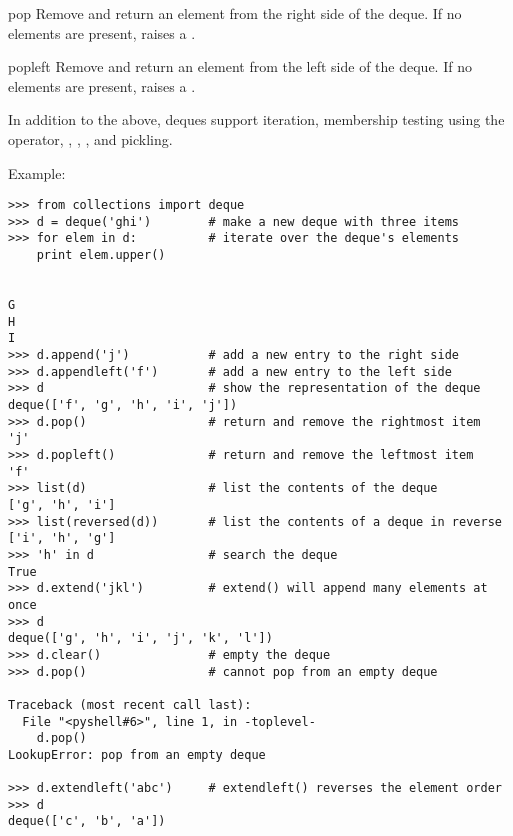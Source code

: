 \begin{methoddesc}{pop}{}
   Remove and return an element from the right side of the deque.
   If no elements are present, raises a .
\end{methoddesc}

\begin{methoddesc}{popleft}{}
   Remove and return an element from the left side of the deque.
   If no elements are present, raises a .   
\end{methoddesc}

In addition to the above, deques support iteration, membership testing
using the  operator, , ,
,  and pickling.

Example:

\begin{verbatim}
>>> from collections import deque
>>> d = deque('ghi')        # make a new deque with three items
>>> for elem in d:          # iterate over the deque's elements
	print elem.upper()

	
G
H
I
>>> d.append('j')           # add a new entry to the right side
>>> d.appendleft('f')       # add a new entry to the left side
>>> d                       # show the representation of the deque
deque(['f', 'g', 'h', 'i', 'j'])
>>> d.pop()                 # return and remove the rightmost item
'j'
>>> d.popleft()             # return and remove the leftmost item
'f'
>>> list(d)                 # list the contents of the deque
['g', 'h', 'i']
>>> list(reversed(d))       # list the contents of a deque in reverse
['i', 'h', 'g']
>>> 'h' in d                # search the deque
True
>>> d.extend('jkl')         # extend() will append many elements at once
>>> d
deque(['g', 'h', 'i', 'j', 'k', 'l'])
>>> d.clear()               # empty the deque
>>> d.pop()                 # cannot pop from an empty deque

Traceback (most recent call last):
  File "<pyshell#6>", line 1, in -toplevel-
    d.pop()
LookupError: pop from an empty deque

>>> d.extendleft('abc')     # extendleft() reverses the element order
>>> d
deque(['c', 'b', 'a'])

\end{verbatim}    
